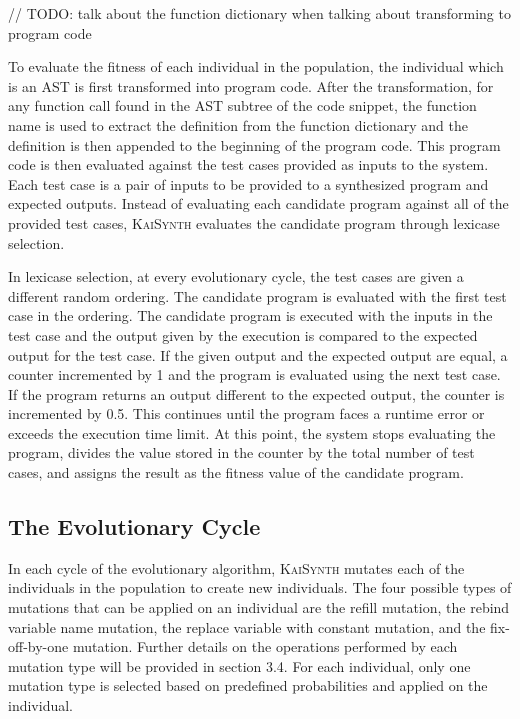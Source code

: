 \documentclass{article}
\begin{document}
// TODO: talk about the function dictionary when talking about transforming to program code

To evaluate the fitness of each individual in the population, the individual which is an AST is first transformed into program code. After the transformation, for any function call found in the AST subtree of the code snippet, the function name is used to extract the definition from the function dictionary and the definition is then appended to the beginning of the program code. This program code is then evaluated against the test cases provided as inputs to the system. Each test case is a pair of inputs to be provided to a synthesized program and expected outputs. Instead of evaluating each candidate program against all of the provided test cases, \textsc{KaiSynth} evaluates the candidate program through lexicase selection.

In lexicase selection, at every evolutionary cycle, the test cases are given a different random ordering. The candidate program is evaluated with the first test case in the ordering. The candidate program is executed with the inputs in the test case and the output given by the execution is compared to the expected output for the test case. If the given output and the expected output are equal, a counter incremented by 1 and the program is evaluated using the next test case. If the program returns an output different to the expected output, the counter is incremented by 0.5. This continues until the program faces a runtime error or exceeds the execution time limit. At this point, the system stops evaluating the program, divides the value stored in the counter by the total number of test cases, and assigns the result as the fitness value of the candidate program. 

\subsection{The Evolutionary Cycle}

In each cycle of the evolutionary algorithm, \textsc{KaiSynth} mutates each of the individuals in the population to create new individuals. The four possible types of mutations that can be applied on an individual are the refill mutation, the rebind variable name mutation, the replace variable with constant mutation, and the fix-off-by-one mutation. Further details on the operations performed by each mutation type will be provided in section 3.4. For each individual, only one mutation type is selected based on predefined probabilities and applied on the individual.
\end{document}

